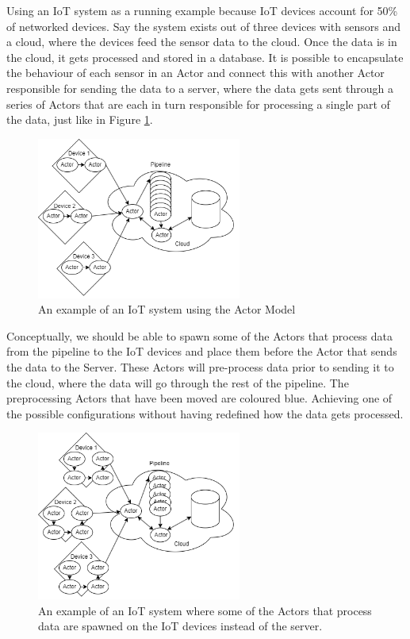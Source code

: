 \documentclass[a4paper]{article}
\begin{document}
Using an IoT system as a running example because IoT devices account for 50\% of networked devices\cite{differentnetworkneedsiot}. Say the system exists out of three devices with sensors and a cloud, where the devices feed the sensor data to the cloud. Once the data is in the cloud, it gets processed and stored in a database. It is possible to encapsulate the behaviour of each sensor in an Actor and connect this with another Actor responsible for sending the data to a server, where the data gets sent through a series of Actors that are each in turn responsible for processing a single part of the data, just like in Figure \ref{fig:iotActorExample1}.
\begin{figure}[H]
    \centering
    \includegraphics[width=0.6\textwidth]{iotActorExample1.png}
    \caption{An example of an IoT system using the Actor Model}
    \label{fig:iotActorExample1}
\end{figure}
Conceptually, we should be able to spawn some of the Actors that process data from the pipeline to the IoT devices and place them before the Actor that sends the data to the Server. These Actors will pre-process data prior to sending it to the cloud, where the data will go through the rest of the pipeline. The preprocessing Actors that have been moved are coloured blue. Achieving one of the possible configurations without having redefined how the data gets processed.
\begin{figure}[H]
    \centering
    \includegraphics[width=0.6\textwidth]{iotActorsMoved.png}
    \caption{An example of an IoT system where some of the Actors that process data are spawned on the IoT devices instead of the server.}
    \label{fig:iotActorExample2}
\end{figure}
\end{document}
